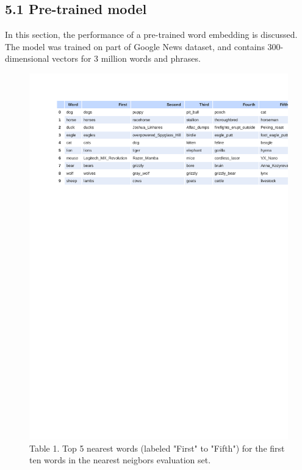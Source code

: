 \documentclass[12pt]{report}
\begin{document}
\subsection*{5.1 Pre-trained model}
In this section, the performance of a pre-trained word embedding is discussed. The model was trained on part of Google News dataset, and contains 300-dimensional vectors for 3 million words and phrases. 
\begin{figure}
	\centering
	\includegraphics[trim=1cm 20cm 0cm 2cm, clip=true,width=\textwidth]{./Figures/google.pdf}
	\caption*{Table 1. Top 5 nearest words (labeled "First" to "Fifth") for the first ten words in the nearest neigbors evaluation set.}
	\label{fig:power}
	
\end{figure}
\end{document}
